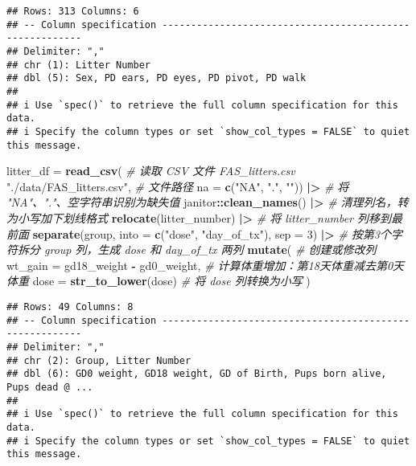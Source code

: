 \documentclass[
]{article}
\newenvironment{Shaded}{\begin{snugshade}}{\end{snugshade}}
\newcommand{\AttributeTok}[1]{\textcolor[rgb]{0.13,0.29,0.53}{#1}}
\newcommand{\CommentTok}[1]{\textcolor[rgb]{0.56,0.35,0.01}{\textit{#1}}}
\newcommand{\DecValTok}[1]{\textcolor[rgb]{0.00,0.00,0.81}{#1}}
\newcommand{\FunctionTok}[1]{\textcolor[rgb]{0.13,0.29,0.53}{\textbf{#1}}}
\newcommand{\NormalTok}[1]{#1}
\newcommand{\OtherTok}[1]{\textcolor[rgb]{0.56,0.35,0.01}{#1}}
\newcommand{\SpecialCharTok}[1]{\textcolor[rgb]{0.81,0.36,0.00}{\textbf{#1}}}
\newcommand{\StringTok}[1]{\textcolor[rgb]{0.31,0.60,0.02}{#1}}
\begin{document}
\begin{verbatim}
## Rows: 313 Columns: 6
## -- Column specification --------------------------------------------------------
## Delimiter: ","
## chr (1): Litter Number
## dbl (5): Sex, PD ears, PD eyes, PD pivot, PD walk
## 
## i Use `spec()` to retrieve the full column specification for this data.
## i Specify the column types or set `show_col_types = FALSE` to quiet this message.
\end{verbatim}

\begin{Shaded}
\begin{Highlighting}[]
\NormalTok{litter\_df }\OtherTok{=} 
  \FunctionTok{read\_csv}\NormalTok{(                                                          }\CommentTok{\# 读取 CSV 文件 FAS\_litters.csv}
    \StringTok{"./data/FAS\_litters.csv"}\NormalTok{,                                        }\CommentTok{\# 文件路径}
    \AttributeTok{na =} \FunctionTok{c}\NormalTok{(}\StringTok{"NA"}\NormalTok{, }\StringTok{"."}\NormalTok{, }\StringTok{""}\NormalTok{)) }\SpecialCharTok{|\textgreater{}}                                        \CommentTok{\# 将 "NA"、"."、空字符串识别为缺失值}
\NormalTok{  janitor}\SpecialCharTok{::}\FunctionTok{clean\_names}\NormalTok{() }\SpecialCharTok{|\textgreater{}}                                          \CommentTok{\# 清理列名，转为小写加下划线格式}
  \FunctionTok{relocate}\NormalTok{(litter\_number) }\SpecialCharTok{|\textgreater{}}                                         \CommentTok{\# 将 litter\_number 列移到最前面}
  \FunctionTok{separate}\NormalTok{(group, }\AttributeTok{into =} \FunctionTok{c}\NormalTok{(}\StringTok{"dose"}\NormalTok{, }\StringTok{"day\_of\_tx"}\NormalTok{), }\AttributeTok{sep =} \DecValTok{3}\NormalTok{) }\SpecialCharTok{|\textgreater{}}         \CommentTok{\# 按第3个字符拆分 group 列，生成 dose 和 day\_of\_tx 两列}
  \FunctionTok{mutate}\NormalTok{(                                                            }\CommentTok{\# 创建或修改列}
    \AttributeTok{wt\_gain =}\NormalTok{ gd18\_weight }\SpecialCharTok{{-}}\NormalTok{ gd0\_weight,                              }\CommentTok{\# 计算体重增加：第18天体重减去第0天体重}
    \AttributeTok{dose =} \FunctionTok{str\_to\_lower}\NormalTok{(dose)                                        }\CommentTok{\# 将 dose 列转换为小写}
\NormalTok{  )}
\end{Highlighting}
\end{Shaded}

\begin{verbatim}
## Rows: 49 Columns: 8
## -- Column specification --------------------------------------------------------
## Delimiter: ","
## chr (2): Group, Litter Number
## dbl (6): GD0 weight, GD18 weight, GD of Birth, Pups born alive, Pups dead @ ...
## 
## i Use `spec()` to retrieve the full column specification for this data.
## i Specify the column types or set `show_col_types = FALSE` to quiet this message.
\end{verbatim}
\end{document}
